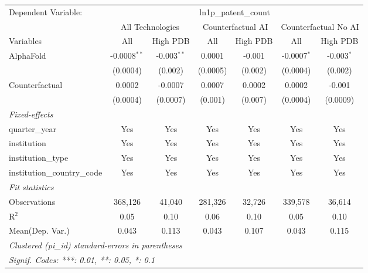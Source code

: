 \begingroup
\centering
\begin{tabular}{lcccccc}
   \tabularnewline \midrule \midrule
   Dependent Variable: & \multicolumn{6}{c}{ln1p\_patent\_count}\\
 & \multicolumn{2}{c}{All Technologies} & \multicolumn{2}{c}{Counterfactual AI} & \multicolumn{2}{c}{Counterfactual No AI} \\
\cmidrule(lr){1-1}\cmidrule(lr){2-3} \cmidrule(lr){4-5} \cmidrule(lr){6-7}
Variables & \multicolumn{1}{c}{All} & \multicolumn{1}{c}{High PDB} & \multicolumn{1}{c}{All} & \multicolumn{1}{c}{High PDB} & \multicolumn{1}{c}{All} & \multicolumn{1}{c}{High PDB} \\
\cmidrule(lr){1-1}\cmidrule(lr){2-2} \cmidrule(lr){3-3} \cmidrule(lr){4-4} \cmidrule(lr){5-5} \cmidrule(lr){6-6} \cmidrule(lr){7-7}
   AlphaFold                    & -0.0008$^{**}$ & -0.003$^{**}$ & 0.0001   & -0.001  & -0.0007$^{*}$ & -0.003$^{*}$\\   
                                & (0.0004)       & (0.002)       & (0.0005) & (0.002) & (0.0004)      & (0.002)\\   
   Counterfactual               & 0.0002         & -0.0007       & 0.0007   & 0.0002  & 0.0002        & -0.001\\   
                                & (0.0004)       & (0.0007)      & (0.001)  & (0.007) & (0.0004)      & (0.0009)\\   
   \midrule
   \emph{Fixed-effects}\\
   quarter\_year                & Yes            & Yes           & Yes      & Yes     & Yes           & Yes\\  
   institution                  & Yes            & Yes           & Yes      & Yes     & Yes           & Yes\\  
   institution\_type            & Yes            & Yes           & Yes      & Yes     & Yes           & Yes\\  
   institution\_country\_code   & Yes            & Yes           & Yes      & Yes     & Yes           & Yes\\  
   \midrule
   \emph{Fit statistics}\\
   Observations                 & 368,126        & 41,040        & 281,326  & 32,726  & 339,578       & 36,614\\  
   R$^2$                        & 0.05           & 0.10          & 0.06     & 0.10    & 0.05          & 0.10\\  
Mean(Dep. Var.) & 0.043 & 0.113 & 0.043 & 0.107 & 0.043 & 0.115 \\
   \midrule \midrule
   \multicolumn{7}{l}{\emph{Clustered (pi\_id) standard-errors in parentheses}}\\
   \multicolumn{7}{l}{\emph{Signif. Codes: ***: 0.01, **: 0.05, *: 0.1}}\\
\end{tabular}
\par\endgroup
